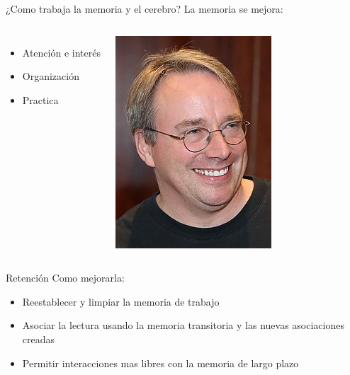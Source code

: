 \documentclass[
10pt,
aspectratio=169,
]{beamer}
\begin{document}
\begin{frame}[c]{¿Como trabaja la memoria y el cerebro?}
La memoria se mejora:
\begin{columns}
\begin{itemize}
\item Atenci\'on e inter\'es
\item Organizaci\'on 
\item Practica
\end{itemize}
\centering
\includegraphics[width=\textwidth]{linus.jpeg}
\end{columns}
\end{frame}


\begin{frame}[c]{Retenci\'on}
Como mejorarla:
\begin{itemize}
\item Reestablecer y limpiar la \alert{memoria de trabajo}
\item Asociar la lectura usando la \alert{memoria transitoria} y las nuevas asociaciones creadas
\item Permitir interacciones mas libres con la \alert{memoria de largo plazo}
\end{itemize}
\end{frame}
\end{document}
